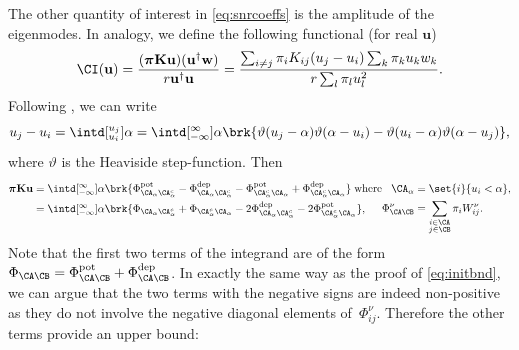 \documentclass[12pt]{article}
\newcommand{\eqm}{\pi}
\newcommand{\eq}{\boldsymbol{\eqm}}
\newcommand{\wm}{w}
\newcommand{\w}{\mathbf{\wm}}
\newcommand{\Wm}{W}
\newcommand{\encm}{K}
\newcommand{\enc}{\mathbf{\encm}}
\newcommand{\Fm}{\Phi}
\newcommand{\pot}{^{\text{pot}}}
\newcommand{\dep}{^{\text{dep}}}
\begin{document}
The other quantity of interest in \cref{eq:snrcoeffs} is the amplitude of the eigenmodes.
In analogy, we define the following functional (for real \(\mathbf{u}\))
%
\begin{equation*}
  \CI(\mathbf{u}) = \frac{(\eq \enc \mathbf{u}) (\mathbf{u}^\dag \w)}{r\mathbf{u}^\dag \mathbf{u}}
      = \frac{\sum_{i \neq j} \eqm_i \encm_{ij} (u_j - u_i) \sum_k \eqm_k u_k \wm_k} 
             {r\sum_{l} \eqm_l u_l^2} .
\end{equation*}
%
Following \cite{Lawler1988cheeger}, we can write
%
\begin{equation*}
  u_j - u_i = \intd[_{u_i}^{u_j}]{\alpha} 
      = \intd[_{-\infty}^{\infty}]{\alpha} 
        \brk{\vartheta(u_j - \alpha) \vartheta(\alpha - u_i) 
           - \vartheta(u_i - \alpha) \vartheta(\alpha - u_j)} ,
\end{equation*}
%
where \(\vartheta\) is the Heaviside step-function.
Then 
%
\begin{equation*}
  \begin{aligned}[t]
  \eq \enc \mathbf{u} &= \intd[_{-\infty}^{\infty}]{\alpha}  \brk{
        \Fm\pot_{\CA_\alpha \CA_\alpha^c} - \Fm\dep_{\CA_\alpha \CA_\alpha^c} 
      - \Fm\pot_{\CA_\alpha^c \CA_\alpha} + \Fm\dep_{\CA_\alpha^c \CA_\alpha} }
  \; \text{where} 
    \\
    &= \intd[_{-\infty}^{\infty}]{\alpha}  \brk{
        \Fm_{\CA_\alpha \CA_\alpha^c} + \Fm_{\CA_\alpha^c \CA_\alpha} 
        - 2\Fm\dep_{\CA_\alpha \CA_\alpha^c} - 2\Fm\pot_{\CA_\alpha^c \CA_\alpha} } ,
  \end{aligned}
  \begin{aligned}[t]
    \CA_\alpha &= \set{i}{u_i < \alpha} , 
    \\
    \Fm^\nu_{\CA \CB} &= \sum_{\substack{i \in \CA \\ j \in \CB}} 
                        \eqm_i \Wm^\nu_{ij} .
  \end{aligned}
\end{equation*}
%
Note that the first two terms of the integrand are of the form \( \Fm_{\CA \CB} = \Fm_{\CA \CB}\pot + \Fm_{\CA \CB}\dep \).
In exactly the same way as the proof of \cref{eq:initbnd}, we can argue that the two terms with the negative signs are indeed non-positive as they do not involve the negative diagonal elements of~\( \Fm_{ij}^\nu \).
Therefore the other terms provide an upper bound:
%
\end{document}
